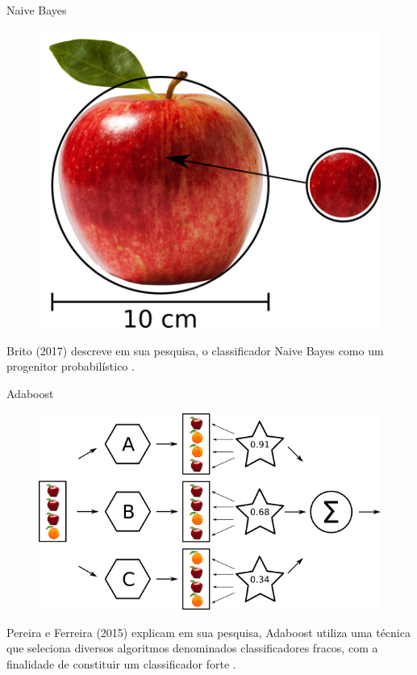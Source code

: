   \begin{frame}[fragile]{Naive Bayes}
    \begin{figure}[H]
        \begin{center}
            \includegraphics[scale=0.50]{images/naive_bayes.png}
        \end{center}
    \end{figure}
    Brito (2017) descreve em sua pesquisa, o classificador Naive Bayes como
    um progenitor probabilístico \cite{de2017mineraccao}.
  \end{frame}

  \begin{frame}[fragile]{Adaboost}
    \begin{figure}[H]
        \begin{center}
            \includegraphics[scale=0.50]{images/adaboost.png}
        \end{center}
    \end{figure}

    Pereira e Ferreira (2015) explicam em sua pesquisa, Adaboost utiliza uma
    técnica que seleciona diversos algoritmos denominados classificadores
    fracos, com a finalidade de constituir um classificador forte
    \cite{pereiraface}.
  \end{frame}

